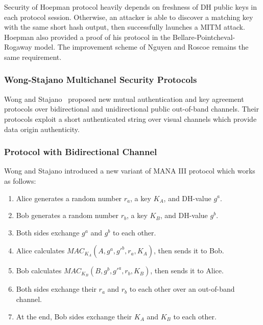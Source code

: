 Security of Hoepman protocol heavily depends on freshness of DH public keys in each protocol session. Otherwise, an attacker is able to discover a matching key with the same short hash output, then successfully launches a MITM attack. Hoepman also provided a proof of his protocol in the Bellare-Pointcheval- Rogaway model. The improvement scheme of Nguyen and Roscoe remains the same requirement. 

\subsubsection{Wong-Stajano Multichanel Security Protocols}\label{WS}

Wong and Stajano~\cite{10.1109/MPRV.2007.76} proposed new mutual authentication and key agreement protocols over bidirectional and unidirectional public out-of-band channels. Their protocols exploit a short authenticated string over visual channels which provide data origin authenticity. 

\subsubsection*{Protocol with Bidirectional Channel}

Wong and Stajano introduced a new variant of MANA III protocol which works as follows:

\begin{enumerate}
\item Alice generates a random number $r_a$, a key $K_A$, and DH-value $g^a$.
\item Bob generates a random number $r_b$, a key $K_B$, and DH-value $g^b$.
\item Both sides exchange $g^a$ and $g^b$ to each other.
\item Alice calculates $MAC_{K_A}(A,g^a,g'^b,r_a,K_A)$, then sends it to Bob. 
\item Bob calculates $MAC_{K_B}(B,g^b,g'^a,r_b,K_B)$, then sends it to Alice.
\item Both sides exchange their $r_a$ and $r_b$ to each other over an out-of-band channel. 
\item At the end, Bob sides exchange their $K_A$ and $K_B$ to each other. 
\end{enumerate}

